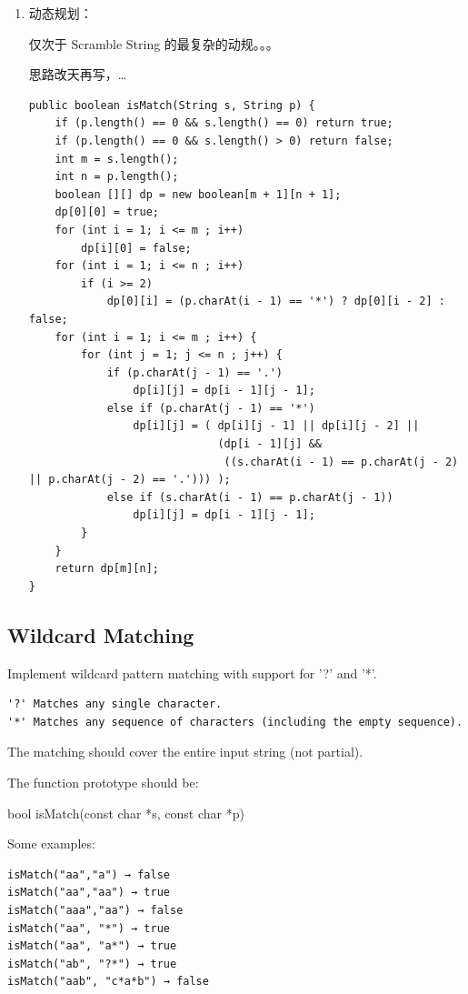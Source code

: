 \documentclass[12pt]{book}
\begin{document}
\begin{enumerate}
\item 动态规划：
\label{sec-14-3-9-2}

仅次于 Scramble String 的最复杂的动规。。。

思路改天再写，\ldots{} 
\lstset{language=java,label= ,caption= ,numbers=none}
\begin{lstlisting}
public boolean isMatch(String s, String p) {
    if (p.length() == 0 && s.length() == 0) return true;
    if (p.length() == 0 && s.length() > 0) return false;
    int m = s.length();
    int n = p.length();
    boolean [][] dp = new boolean[m + 1][n + 1];
    dp[0][0] = true;
    for (int i = 1; i <= m ; i++)
        dp[i][0] = false;
    for (int i = 1; i <= n ; i++)
        if (i >= 2)
            dp[0][i] = (p.charAt(i - 1) == '*') ? dp[0][i - 2] : false;
    for (int i = 1; i <= m ; i++) {
        for (int j = 1; j <= n ; j++) {
            if (p.charAt(j - 1) == '.')
                dp[i][j] = dp[i - 1][j - 1];
            else if (p.charAt(j - 1) == '*')
                dp[i][j] = ( dp[i][j - 1] || dp[i][j - 2] ||
                             (dp[i - 1][j] &&
                              ((s.charAt(i - 1) == p.charAt(j - 2)  || p.charAt(j - 2) == '.'))) );
            else if (s.charAt(i - 1) == p.charAt(j - 1)) 
                dp[i][j] = dp[i - 1][j - 1];
        }
    }
    return dp[m][n];
}
\end{lstlisting}
\end{enumerate}

\subsection{Wildcard Matching}
\label{sec-14-3-10}
Implement wildcard pattern matching with support for '?' and '*'.
\lstset{language=java,label= ,caption= ,numbers=none}
\begin{lstlisting}
'?' Matches any single character.
'*' Matches any sequence of characters (including the empty sequence).
\end{lstlisting}

The matching should cover the entire input string (not partial).

The function prototype should be:

bool isMatch(const char *s, const char *p)

Some examples:
\lstset{language=java,label= ,caption= ,numbers=none}
\begin{lstlisting}
isMatch("aa","a") → false
isMatch("aa","aa") → true
isMatch("aaa","aa") → false
isMatch("aa", "*") → true
isMatch("aa", "a*") → true
isMatch("ab", "?*") → true
isMatch("aab", "c*a*b") → false
\end{lstlisting}
\end{document}
